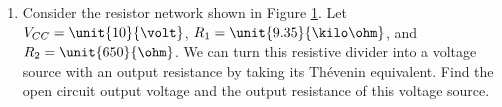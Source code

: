 \documentclass{article}
\begin{document}
\thispagestyle{plain}

\name

\begin{enumerate}
		\begin{figure}[!htb]
			
			\centerline{\box\graph}
			\caption{Resistive divider ``voltage source''}
			\label{resvsource}
		\end{figure}
	\item Consider the resistor network shown in Figure \ref{resvsource}. Let $V_{CC} = \unit{10}{\volt}$, $R_1 = \unit{9.35}{\kilo\ohm}$, and $R_2 = \unit{650}{\ohm}$. We can turn this resistive divider into a voltage source with an output resistance by taking its Th\'{e}venin equivalent. Find the open circuit output voltage and the output resistance of this voltage source.
	\\~\\~\\~\\~\\~\\~\\~\\
	

\end{enumerate}
\end{document}
